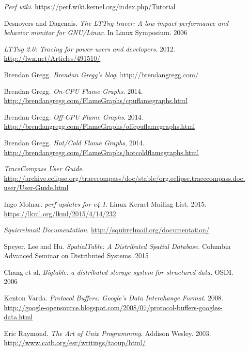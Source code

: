 \documentclass[10pt]{article}
\begin{document}
\raggedright
\begin{thebibliography}{9}
  \emph{Perf wiki}.
  \url{https://perf.wiki.kernel.org/index.php/Tutorial}

  Desnoyers and Dagenais.
  \emph{The LTTng tracer: A low impact performance and behavior monitor for
  GNU/Linux}.
   In Linux Symposium.
   2006

  \emph{LTTng 2.0: Tracing for power users and developers}.
  2012.
  \url{http://lwn.net/Articles/491510/}

  Brendan Gregg.
  \emph{Brendan Gregg's blog}.
  \url{http://brendangregg.com/}

  Brendan Gregg.
  \emph{On-CPU Flame Graphs}.
   2014.
   \url{http://brendangregg.com/FlameGraphs/cpuflamegraphs.html}

  Brendan Gregg.
  \emph{Off-CPU Flame Graphs}.
   2014.
   \url{http://brendangregg.com/FlameGraphs/offcpuflamegraphs.html}

  Brendan Gregg.
  \emph{Hot/Cold Flame Graphs},
   2014.
   \url{http://brendangregg.com/FlameGraphs/hotcoldflamegraphs.html}

  \emph{TraceCompass User Guide}.
  \url{http://archive.eclipse.org/tracecompass/doc/stable/org.eclipse.tracecompass.doc.user/User-Guide.html}

  Ingo Molnar.
  \emph{perf updates for v4.1}.
  Linux Kernel Mailing List.
  2015.
  \url{https://lkml.org/lkml/2015/4/14/232}

  \emph{Squirrelmail Documentation}.
  \url{http://squirrelmail.org/documentation/}

  Speyer, Lee and Hu.
  \emph{SpatialTable: A Distributed Spatial Database}.
  Columbia Advanced Seminar on Distributed Systems.
  2015

  Chang et al.
  \emph{Bigtable: a distributed storage system for structured data}.
  OSDI.
  2006

  Kenton Varda.
  \emph{Protocol Buffers: Google's Data Interchange Format}.
  2008.
  \url{http://google-opensource.blogspot.com/2008/07/protocol-buffers-googles-data.html}

  Eric Raymond.
  \emph{The Art of Unix Programming}.
  Addison Wesley.
  2003.
  \url{http://www.catb.org/esr/writings/taoup/html/}

\end{thebibliography}
\end{document}
